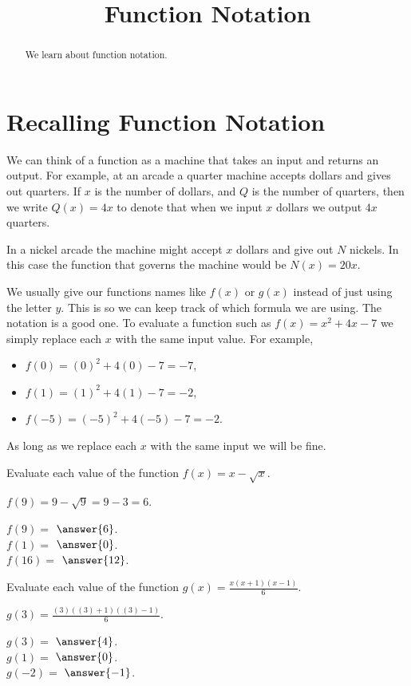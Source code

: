 \documentclass{ximera}
\title{Function Notation}
\begin{document}
\begin{abstract}
We learn about function notation.
\end{abstract}
\maketitle

\section*{Recalling Function Notation}
We can think of a function as a machine that takes an input and returns an output. For example, at an arcade a quarter machine accepts dollars and gives out quarters. If $x$ is the number of dollars, and $Q$ is the number of quarters, then we write $Q(x)=4x$ to denote that when we input $x$ dollars we output $4x$ quarters.

In a nickel arcade the machine might accept $x$ dollars and give out $N$ nickels. In this case the function that governs the machine would be $N(x)=20x$. 

We usually give our functions names like $f(x)$ or $g(x)$ instead of just using the letter $y$. This is so we can keep track of which formula we are using. The notation is a good one. To evaluate a function such as $f(x)=x^2+4x-7$ we simply replace each $x$ with the same input value. For example,
\begin{itemize}
\item $f(0)=(0)^2+4(0)-7=-7$,
\item $f(1)=(1)^2+4(1)-7=-2$,
\item $f(-5)=(-5)^2+4(-5)-7=-2$.
\end{itemize}
As long as we replace each $x$ with the same input we will be fine. 

\begin{question}
Evaluate each value of the function $f(x)=x-\sqrt{x}$.
\begin{solution}
\begin{hint}
$f(9)=9-\sqrt{9}=9-3=6$. 
\end{hint}
$f(9)=$ $\answer{6}$.\\
$f(1)=$ $\answer{0}$.\\
$f(16)=$ $\answer{12}$.
\end{solution}
\end{question}

\begin{question}
Evaluate each value of the function $g(x)=\frac{x(x+1)(x-1)}{6}$.
\begin{solution}
\begin{hint}
$g(3)=\frac{(3)\left((3)+1\right)\left((3)-1\right)}{6}$. 
\end{hint}
$g(3)=$ $\answer{4}$.\\
$g(1)=$ $\answer{0}$.\\
$g(-2)=$ $\answer{-1}$.
\end{solution}
\end{question}
\end{document}
